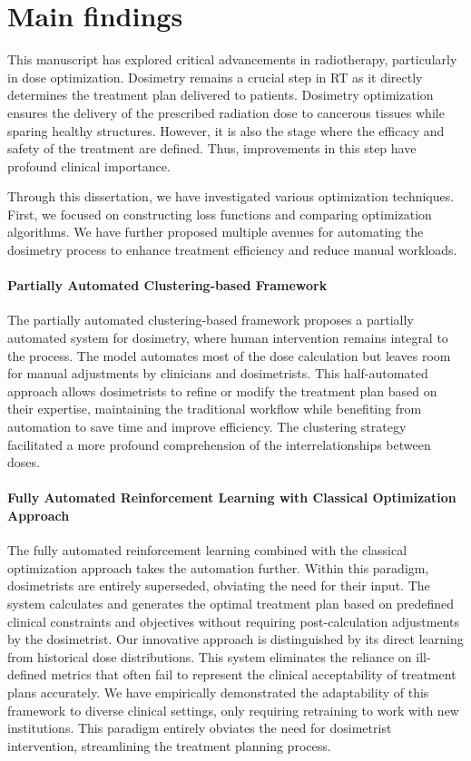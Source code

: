 \section{Main findings}
This manuscript has explored critical advancements in radiotherapy, particularly in dose optimization.
Dosimetry remains a crucial step in RT as it directly determines the treatment plan delivered to patients.
Dosimetry optimization ensures the delivery of the prescribed radiation dose to cancerous tissues while sparing healthy structures.
However, it is also the stage where the efficacy and safety of the treatment are defined.
Thus, improvements in this step have profound clinical importance.

Through this dissertation, we have investigated various optimization techniques.
First, we focused on constructing loss functions and comparing optimization algorithms.
We have further proposed multiple avenues for automating the dosimetry process to enhance treatment efficiency and reduce manual workloads.

\paragraph{Partially Automated Clustering-based Framework}
The partially automated clustering-based framework proposes a partially automated system for dosimetry, where human intervention remains integral to the process.
The model automates most of the dose calculation but leaves room for manual adjustments by clinicians and dosimetrists.
This half-automated approach allows dosimetrists to refine or modify the treatment plan based on their expertise, maintaining the traditional workflow while benefiting from automation to save time and improve efficiency.
The clustering strategy facilitated a more profound comprehension of the interrelationships between doses.

\paragraph{Fully Automated Reinforcement Learning with Classical Optimization Approach}
The fully automated reinforcement learning combined with the classical optimization approach takes the automation further.
Within this paradigm, dosimetrists are entirely superseded, obviating the need for their input.
The system calculates and generates the optimal treatment plan based on predefined clinical constraints and objectives without requiring post-calculation adjustments by the dosimetrist.
Our innovative approach is distinguished by its direct learning from historical dose distributions.
This system eliminates the reliance on ill-defined metrics that often fail to represent the clinical acceptability of treatment plans accurately.
We have empirically demonstrated the adaptability of this framework to diverse clinical settings, only requiring retraining to work with new institutions.
This paradigm entirely obviates the need for dosimetrist intervention, streamlining the treatment planning process.

